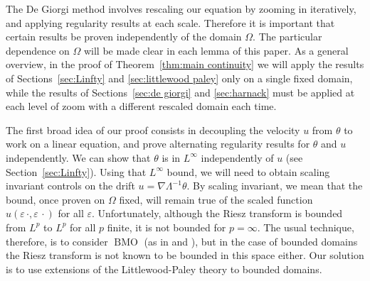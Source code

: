 \documentclass[11pt]{amsart}
\theoremstyle{remark}
\theoremstyle{definition}
\newcommand{\eps}{\varepsilon}
\DeclareMathOperator{\BMO}{BMO}
\newcommand{\grad}{\nabla}
\begin{document}
The De Giorgi method involves rescaling our equation by zooming in iteratively, and applying regularity results at each scale.  Therefore it is important that certain results be proven independently of the domain $\Omega$.  
The particular dependence on $\Omega$ will be made clear in each lemma of this paper.  
As a general overview, in the proof of Theorem~\ref{thm:main continuity} we will apply the results of Sections~\ref{sec:Linfty} and \ref{sec:littlewood paley} only on a single fixed domain, while the results of Sections~\ref{sec:de giorgi} and \ref{sec:harnack} must be applied at each level of zoom with a different rescaled domain each time.  

\vskip0.3cm

The first broad  idea of our proof consists in decoupling the  velocity $u$ from  $\theta$ to work on  a linear equation, and prove alternating regularity results for $\theta$ and $u$ independently.  We can show that $\theta$ is in $L^\infty$ independently of $u$ (see Section~\ref{sec:Linfty}).  
Using that $L^\infty$ bound, we will need to obtain scaling invariant controls on the drift   $u = \grad \Lambda^{-1} \theta$.  By scaling invariant, we mean that the bound, once proven on $\Omega$ fixed, will remain true of the scaled function $u(\eps \, \cdot, \eps \, \cdot)$ for all $\eps$.  
Unfortunately, although the Riesz transform is bounded from $L^p$ to $L^p$ for all $p$ finite, it is not bounded for $p = \infty$.  
The usual technique, therefore, is to consider $\BMO$ (as in \cite{CaVa.sqg} and \cite{NoVa.qg}), but in the case of bounded domains the Riesz transform is not known to be bounded in this space either.  Our solution is to use extensions of the Littlewood-Paley theory to bounded domains. 
\end{document}
